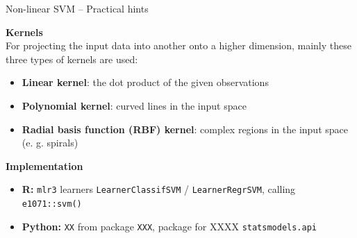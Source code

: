 \documentclass[11pt,compress,t,notes=noshow, xcolor=table]{beamer}
\newcommand{\highlight}[1]{\textcolor{highlightcol}{\textbf{#1}}}
\let\code=\texttt
\begin{document}

\begin{frame}{Non-linear SVM -- Practical hints}

\footnotesize

  \highlight{Kernels} \\
  \smallskip
 For projecting the input data into another onto a higher dimension, mainly these three types of kernels are used: 
 \begin{itemize}
 
 \item \textbf{Linear kernel}: the dot product of the given observations
 
 \item \textbf{Polynomial kernel}: curved lines in the input space
 
 \item \textbf{Radial basis function (RBF) kernel}: complex regions in the input space (e. g. spirals)
 
 \end{itemize}
 
 

\medskip

  \highlight{Implementation} 
  \begin{itemize}
    \item \textbf{R:} \code{mlr3} learners \code{LearnerClassifSVM} / 
    \code{LearnerRegrSVM}, calling \code{e1071::svm()}
    \item \textbf{Python:} \code{XX} from package \code{XXX}, package for XXXX 
    \code{statsmodels.api}
  \end{itemize}

\end{frame}


\end{document}
